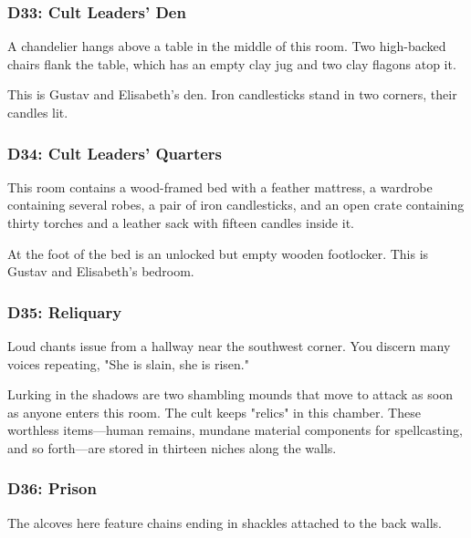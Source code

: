 \documentclass[10pt,a4paper,twoside,bg=print,twocolumn,openany,nodeprecatedcode]{dndbook}
\begin{document}
\subsubsection{D33: Cult Leaders' Den}
\begin{DndReadAloud}{}
A chandelier hangs above a table in the middle of this room. Two high-backed chairs flank the table, which has an empty clay jug and two clay flagons atop it.

\end{DndReadAloud}

This is Gustav and Elisabeth's den. Iron candlesticks stand in two corners, their candles lit.

\subsubsection{D34: Cult Leaders' Quarters}
\begin{DndReadAloud}{}
This room contains a wood-framed bed with a feather mattress, a wardrobe containing several robes, a pair of iron candlesticks, and an open crate containing thirty torches and a leather sack with fifteen candles inside it.

\end{DndReadAloud}

At the foot of the bed is an unlocked but empty wooden footlocker. This is Gustav and Elisabeth's bedroom.

\subsubsection{D35: Reliquary}
\begin{DndReadAloud}{}
Loud chants issue from a hallway near the southwest corner. You discern many voices repeating, "She is slain, she is risen."

\end{DndReadAloud}

Lurking in the shadows are two shambling mounds that move to attack as soon as anyone enters this room. The cult keeps "relics" in this chamber. These worthless items—human remains, mundane material components for spellcasting, and so forth—are stored in thirteen niches along the walls.

\subsubsection{D36: Prison}
\begin{DndReadAloud}{}
The alcoves here feature chains ending in shackles attached to the back walls.

\end{DndReadAloud}
\end{document}
